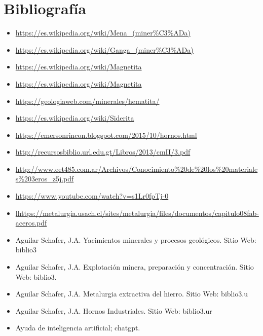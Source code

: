 \documentclass[12pt,a4paper]{article}
\begin{document}
\newpage
\section{Bibliografía}
\begin{itemize}
    \item \url{https://es.wikipedia.org/wiki/Mena_(miner%C3%ADa)}
    \item \url{https://es.wikipedia.org/wiki/Ganga_(miner%C3%ADa)}
    \item \url{https://es.wikipedia.org/wiki/Magnetita}
    \item \url{https://es.wikipedia.org/wiki/Magnetita}
    \item \url{https://geologiaweb.com/minerales/hematita/}
    \item \url{https://es.wikipedia.org/wiki/Siderita}
    \item \url{https://emersonrincon.blogspot.com/2015/10/hornos.html}
    \item \url{http://recursosbiblio.url.edu.gt/Libros/2013/cmII/3.pdf}
    \item \url{http://www.eet485.com.ar/Archivos/Conocimiento%20de%20los%20materiales%203eros_z5j.pdf}
    \item \url{https://www.youtube.com/watch?v=s1Lr0fpTj-0}
    \item \url{lhttps://metalurgia.usach.cl/sites/metalurgia/files/documentos/capitulo08fab-aceros.pdf}
    \item Aguilar Schafer, J.A. Yacimientos minerales y procesos geológicos. Sitio Web: biblio3
    \item Aguilar Schafer, J.A. Explotación minera, preparación y concentración. Sitio Web: biblio3.
    \item Aguilar Schafer, J.A. Metalurgia extractiva del hierro. Sitio Web: biblio3.u
    \item Aguilar Schafer, J.A. Hornos Industriales. Sitio Web: biblio3.ur
    \item Ayuda de inteligencia artificial; chatgpt.
\end{itemize}
\end{document}
